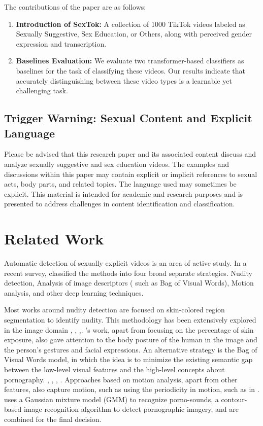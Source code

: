 \documentclass[11pt]{article}
\begin{document}
The contributions of the paper are as follows:

\begin{enumerate}
    \item \textbf{Introduction of SexTok:} A collection of 1000 TikTok videos labeled as Sexually Suggestive, Sex Education, or Others, along with perceived gender expression and transcription.
    \item \textbf{Baselines Evaluation:} We evaluate two transformer-based classifiers as baselines for the task of classifying these videos. Our results indicate that accurately distinguishing between these video types is a learnable yet challenging task.
\end{enumerate}

\subsection*{Trigger Warning: Sexual Content and Explicit Language}
Please be advised that this research paper and its associated content discuss and analyze sexually suggestive and sex education videos. The examples and discussions within this paper may contain explicit or implicit references to sexual acts, body parts, and related topics. The language used may sometimes be explicit. This material is intended for academic and research purposes and is presented to address challenges in content identification and classification.
\section{Related Work}
Automatic detection of sexually explicit videos is an area of active study. In a recent survey, \citealp{cifuentes2022survey} classified the methods into four broad separate strategies. Nudity detection, Analysis of image descriptors ( such as Bag of Visual Words), Motion analysis, and other deep learning techniques. 

Most works around nudity detection are focused on skin-colored region segmentation to identify nudity. This methodology has been extensively explored in the image domain \cite{fleck1996finding}, \cite{wang2005identification} \cite{platzer2014skin}, \cite{garcia2018pornographic},\cite{lee2006implementation}. \cite{ganguly2017detecting}'s work, apart from focusing on the percentage of skin exposure, also gave attention to the body posture of the human in the image and the person's gestures and facial expressions. An alternative strategy is the Bag of Visual Words model,  in which the idea is to minimize the existing semantic gap between the low-level visual features and the high-level concepts about pornography. \cite{deselaers2008bag}, \cite{lopes2009bag}, \cite{ulges2011automatic}, \cite{zhang2013approach}. Approaches based on motion analysis, apart from other features, also capture motion, such as using the periodicity in motion, such as in \cite{4156017}. \cite{zuo2008recognition} uses a Gaussian mixture model (GMM) to recognize porno-sounds, a contour-based image recognition algorithm to detect pornographic imagery, and are combined for the final decision. 
\end{document}
